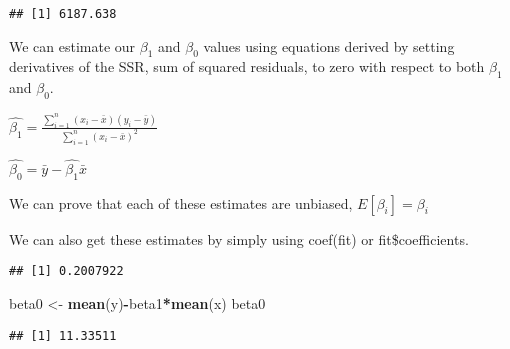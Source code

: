 \documentclass[
]{article}
\newenvironment{Shaded}{\begin{snugshade}}{\end{snugshade}}
\newcommand{\DecValTok}[1]{\textcolor[rgb]{0.00,0.00,0.81}{#1}}
\newcommand{\FunctionTok}[1]{\textcolor[rgb]{0.13,0.29,0.53}{\textbf{#1}}}
\newcommand{\NormalTok}[1]{#1}
\newcommand{\OtherTok}[1]{\textcolor[rgb]{0.56,0.35,0.01}{#1}}
\newcommand{\SpecialCharTok}[1]{\textcolor[rgb]{0.81,0.36,0.00}{\textbf{#1}}}
\begin{document}
\begin{verbatim}
## [1] 6187.638
\end{verbatim}

We can estimate our \(\beta_1\) and \(\beta_0\) values using equations
derived by setting derivatives of the SSR, sum of squared residuals, to
zero with respect to both \(\beta_1\) and \(\beta_0\).

\(\hat{\beta_1} = \frac{\sum_{i=1}^n(x_i-\bar{x})(y_i-\bar{y})}{\sum_{i=1}^n(x_i-\bar{x})^2}\)

\(\hat{\beta_0} = \bar{y} - \hat{\beta_1}\bar{x}\)

We can prove that each of these estimates are unbiased,
\(E[\beta_i] = \beta_i\)

We can also get these estimates by simply using coef(fit) or
fit\$coefficients.

\begin{Shaded}
\end{Shaded}

\begin{verbatim}
## [1] 0.2007922
\end{verbatim}

\begin{Shaded}
\begin{Highlighting}[]
\NormalTok{beta0 }\OtherTok{\textless{}{-}} \FunctionTok{mean}\NormalTok{(y)}\SpecialCharTok{{-}}\NormalTok{beta1}\SpecialCharTok{*}\FunctionTok{mean}\NormalTok{(x) }
\NormalTok{beta0}
\end{Highlighting}
\end{Shaded}

\begin{verbatim}
## [1] 11.33511
\end{verbatim}
\end{document}
